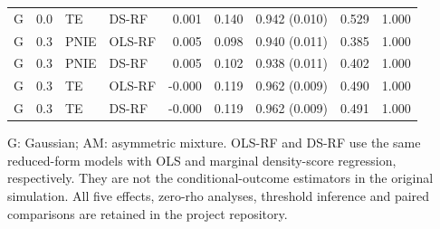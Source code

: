 \begin{table}[htbp]
\begin{tabular}{lrllrrrrr}
G & 0.0 & TE & DS-RF & 0.001 & 0.140 & 0.942 (0.010) & 0.529 & 1.000\\
G & 0.3 & PNIE & OLS-RF & 0.005 & 0.098 & 0.940 (0.011) & 0.385 & 1.000\\
G & 0.3 & PNIE & DS-RF & 0.005 & 0.102 & 0.938 (0.011) & 0.402 & 1.000\\
G & 0.3 & TE & OLS-RF & -0.000 & 0.119 & 0.962 (0.009) & 0.490 & 1.000\\
G & 0.3 & TE & DS-RF & -0.000 & 0.119 & 0.962 (0.009) & 0.491 & 1.000\\
\bottomrule\end{tabular}
\par\smallskip\begin{minipage}{0.98\textwidth}\footnotesize G: Gaussian; AM: asymmetric mixture. OLS-RF and DS-RF use the same reduced-form models with OLS and marginal density-score regression, respectively. They are not the conditional-outcome estimators in the original simulation. All five effects, zero-rho analyses, threshold inference and paired comparisons are retained in the project repository.\end{minipage}
\end{table}
